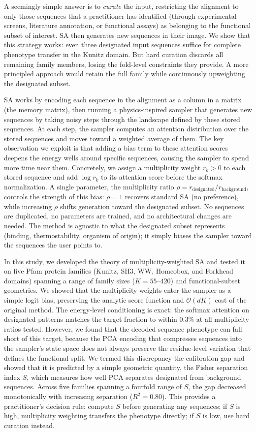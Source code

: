 A seemingly simple answer is to \emph{curate} the input, restricting the alignment to only those
sequences that a practitioner has identified (through experimental screens, literature annotation,
or functional assays) as belonging to the functional subset of interest. SA then generates new
sequences in their image. We show that this strategy works: even three designated input sequences
suffice for complete phenotype transfer in the Kunitz domain. But hard curation discards all
remaining family members, losing the fold-level constraints they provide. A more principled
approach would retain the full family while continuously upweighting the designated subset.

SA works by encoding each sequence in the alignment as a column in a matrix (the memory matrix),
then running a physics-inspired sampler that generates new sequences by taking noisy steps through
the landscape defined by these stored sequences. At each step, the sampler computes an attention
distribution over the stored sequences and moves toward a weighted average of them. The key
observation we exploit is that adding a bias term to these attention scores deepens the energy
wells around specific sequences, causing the sampler to spend more time near them. Concretely,
we assign a multiplicity weight $r_k > 0$ to each stored sequence and add $\log r_k$ to its
attention score before the softmax normalization. A single parameter, the multiplicity ratio
$\rho = r_{\mathrm{designated}}/r_{\mathrm{background}}$, controls the strength of this bias:
$\rho = 1$ recovers standard SA (no preference), while increasing $\rho$ shifts generation
toward the designated subset. No sequences are duplicated, no parameters are trained, and no
architectural changes are needed. The method is agnostic to what the designated subset
represents (binding, thermostability, organism of origin); it simply biases the sampler toward
the sequences the user points to.

In this study, we developed the theory of multiplicity-weighted SA and tested it on five Pfam
protein families (Kunitz, SH3, WW, Homeobox, and Forkhead domains) spanning a range of family
sizes ($K = 55$--$420$) and functional-subset geometries. We showed that the multiplicity
weights enter the sampler as a simple logit bias, preserving the analytic score function and
$\mathcal{O}(dK)$ cost of the original method. The energy-level conditioning is exact: the
softmax attention on designated patterns matches the target fraction to within $0.3\%$ at all
multiplicity ratios tested. However, we found that the decoded sequence phenotype can fall short
of this target, because the PCA encoding that compresses sequences into the sampler's state space
does not always preserve the residue-level variation that defines the functional split. We termed
this discrepancy the calibration gap and showed that it is predicted by a simple geometric
quantity, the Fisher separation index $S$, which measures how well PCA separates designated from
background sequences. Across five families spanning a fourfold range of $S$, the gap decreased
monotonically with increasing separation ($R^{2} = 0.80$). This provides a practitioner's
decision rule: compute $S$ before generating any sequences; if $S$ is high, multiplicity
weighting transfers the phenotype directly; if $S$ is low, use hard curation instead.
